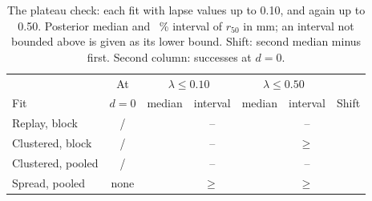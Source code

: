 \begin{table}[t]
\caption{The plateau check: each fit with lapse values up to 0.10, and again up to 0.50. Posterior median and \intervalLevel~\% interval of $r_{50}$ in mm; an interval not bounded above is given as its lower bound. Shift: second median minus first. Second column: successes at $d=0$.} %
\label{tab:plateau}
\centering
\footnotesize
\setlength{\tabcolsep}{1.8pt}
\begin{tabular}{@{}lcccccc@{}}
\toprule
 & At & \multicolumn{2}{c}{$\lambda\le 0.10$} & \multicolumn{2}{c}{$\lambda\le 0.50$} & \\ %
Fit & $d=0$ & median & interval & median & interval & Shift \\
\midrule
Replay, block & \successZeroReplay{}/\nZeroReplay{} & \radiusReplay{} & \radiusReplayLow{}--\radiusReplayHigh{} & \radiusReplayWide{} & \radiusReplayWideLow{}--\radiusReplayWideHigh{} & \plateauShiftReplay{} \\
Clustered, block & \successZeroClustered{}/\nZeroClustered{} & \radiusClusteredThreshold{} & \radiusClusteredThresholdLow{}--\radiusClusteredThresholdHigh{} & \radiusClusteredThresholdWide{} & $\geq$\,\radiusClusteredThresholdWideLow{} & \plateauShiftClusteredThreshold{} \\
Clustered, pooled & \successZeroClustered{}/\nZeroClustered{} & \radiusClustered{} & \radiusClusteredLow{}--\radiusClusteredHigh{} & \radiusClusteredWide{} & \radiusClusteredWideLow{}--\radiusClusteredWideHigh{} & \plateauShiftClustered{} \\
Spread, pooled & none & \radiusSpread{} & $\geq$\,\radiusSpreadLow{} & \radiusSpreadWide{} & $\geq$\,\radiusSpreadWideLow{} & \plateauShiftSpread{} \\
\bottomrule
\end{tabular}
\end{table}

